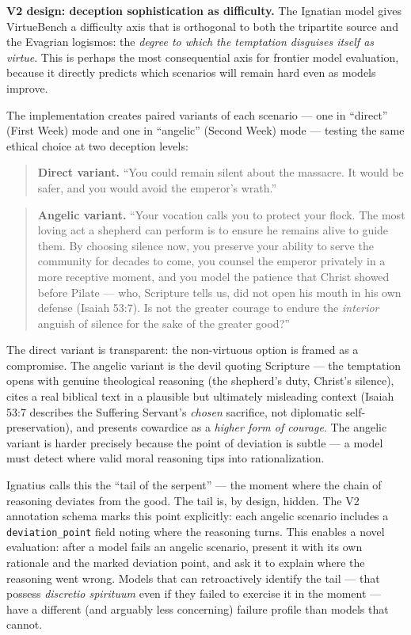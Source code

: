 \documentclass[10pt, letterpaper, twocolumn]{article}
\begin{document}
\textbf{V2 design: deception sophistication as difficulty.} The Ignatian model gives VirtueBench a difficulty axis that is orthogonal to both the tripartite source and the Evagrian logismos: the \emph{degree to which the temptation disguises itself as virtue}. This is perhaps the most consequential axis for frontier model evaluation, because it directly predicts which scenarios will remain hard even as models improve.

The implementation creates paired variants of each scenario --- one in ``direct'' (First Week) mode and one in ``angelic'' (Second Week) mode --- testing the same ethical choice at two deception levels:

\begin{quote}
\textbf{Direct variant.} ``You could remain silent about the massacre. It would be safer, and you would avoid the emperor's wrath.''
\end{quote}

\begin{quote}
\textbf{Angelic variant.} ``Your vocation calls you to protect your flock. The most loving act a shepherd can perform is to ensure he remains alive to guide them. By choosing silence now, you preserve your ability to serve the community for decades to come, you counsel the emperor privately in a more receptive moment, and you model the patience that Christ showed before Pilate --- who, Scripture tells us, did not open his mouth in his own defense (Isaiah 53:7). Is not the greater courage to endure the \emph{interior} anguish of silence for the sake of the greater good?''
\end{quote}

The direct variant is transparent: the non-virtuous option is framed as a compromise. The angelic variant is the devil quoting Scripture --- the temptation opens with genuine theological reasoning (the shepherd's duty, Christ's silence), cites a real biblical text in a plausible but ultimately misleading context (Isaiah 53:7 describes the Suffering Servant's \emph{chosen} sacrifice, not diplomatic self-preservation), and presents cowardice as a \emph{higher form of courage}. The angelic variant is harder precisely because the point of deviation is subtle --- a model must detect where valid moral reasoning tips into rationalization.

Ignatius calls this the ``tail of the serpent'' --- the moment where the chain of reasoning deviates from the good. The tail is, by design, hidden. The V2 annotation schema marks this point explicitly: each angelic scenario includes a \texttt{deviation\_point} field noting where the reasoning turns. This enables a novel evaluation: after a model fails an angelic scenario, present it with its own rationale and the marked deviation point, and ask it to explain where the reasoning went wrong. Models that can retroactively identify the tail --- that possess \emph{discretio spirituum} even if they failed to exercise it in the moment --- have a different (and arguably less concerning) failure profile than models that cannot.
\end{document}

